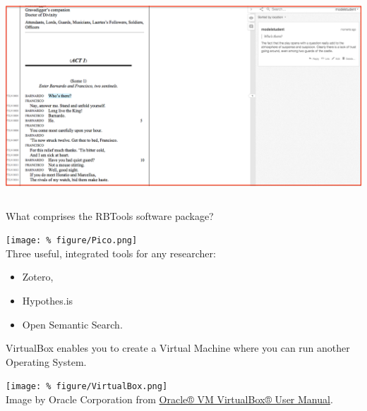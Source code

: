 \documentclass[unknownkeysallowed,usepdftitle=false, parskip=full, aspectratio-1610]{beamer}
\newcommand{\secvariable}{nothing}
\newcommand{\mysection}[1]{\renewcommand{\secvariable}{#1}
}
\begin{document}
\begin{frame}
{\begin{columns}[t]
\begin{column}[c]{0.5\textwidth}
\includegraphics[width=1\textwidth,height=0.25\textheight,keepaspectratio]{figure/Hypothesis.png}\\

   \end{column}
  \end{columns}
}
 
\end{frame}

\mysection{radar}
\begin{frame}\label{\secvariable}

What comprises the RBTools software package?

\texttt{[image: \%
figure/Pico.png]}\\

Three useful, integrated tools for any researcher:
\begin{itemize}
    \item Zotero,
    \item Hypothes.is 
    \item Open Semantic Search.
    \end{itemize}

\end{frame}

\mysection{line}
\begin{frame}\label{\secvariable}

VirtualBox enables you to create a Virtual Machine where you can run another Operating System.
  \vspace{0.5cm}
  
  \texttt{[image: \%
figure/VirtualBox.png]}\\  
\tiny Image by Oracle Corporation from \href{https://www.virtualbox.org/manual/}{Oracle® VM VirtualBox® User Manual}.

\end{frame}
\end{document}
